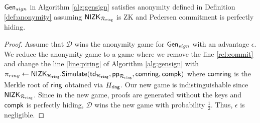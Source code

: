 %	
%	


\begin{lemma} \label{lem:anonymity} $ \mathsf{Gen}_{sign}$ in Algorithm \ref{alg:gensign} satisfies anonymity defined in Definition \ref{def:anonymity} assuming  $ {\mathsf{NIZK}}_{\mathcal{R}_{\mathtt{ring}}} $ is ZK and Pedersen commitment is perfectly hiding.
\end{lemma}

\begin{proof} Assume that $ \mathcal{D} $ wins the anonymity game for $ \mathsf{Gen}_{sign} $ with an advantage $ \epsilon $.
We reduce the anonymity game to a game where we remove the line \ref{rel:commit} and change the line \ref{line:piring} of Algorithm \ref{alg:gensign} with $ \pi_{ring} \leftarrow {\ensuremath{\mathsf{NIZK}}}_{\mathcal{R}_{\mathtt{ring}}}.\mathsf{Simulate}(\mathsf{td}_{\mathcal{R}_{\mathtt{ring}}}, \mathsf{pp}_{\mathcal{R}_{\mathtt{ring}}},\mathsf{comring}, \mathsf{compk}) $ where $ \mathsf{comring} $ is the Merkle root of $ \mathsf{ring} $ obtained via $ H_\mathsf{ring} $.  Our new game is indistinguishable since $ {\mathsf{NIZK}}_{\mathcal{R}_{\mathtt{ring}}} $.  Since in the new game, proofs are generated without the keys and $ \mathsf{compk} $ is perfectly hiding,   $ \mathcal{D} $ wins the new game with probability $ \frac{1}{2} $. Thus, $ \epsilon $ is negligible.		
\end{proof}




